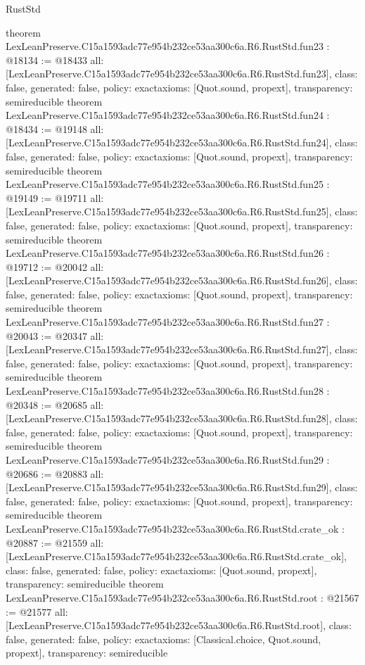 \begin{lexlean}{RustStd}
\begin{coremodule}
{}
theorem LexLeanPreserve.C15a1593adc77e954b232ce53aa300c6a.R6.RustStd.fun23 : @18134 := @18433 {
  all: [LexLeanPreserve.C15a1593adc77e954b232ce53aa300c6a.R6.RustStd.fun23],
  class: false,
  generated: false,
  policy: exact{axioms: [Quot.sound, propext]},
  transparency: semireducible
}
theorem LexLeanPreserve.C15a1593adc77e954b232ce53aa300c6a.R6.RustStd.fun24 : @18434 := @19148 {
  all: [LexLeanPreserve.C15a1593adc77e954b232ce53aa300c6a.R6.RustStd.fun24],
  class: false,
  generated: false,
  policy: exact{axioms: [Quot.sound, propext]},
  transparency: semireducible
}
theorem LexLeanPreserve.C15a1593adc77e954b232ce53aa300c6a.R6.RustStd.fun25 : @19149 := @19711 {
  all: [LexLeanPreserve.C15a1593adc77e954b232ce53aa300c6a.R6.RustStd.fun25],
  class: false,
  generated: false,
  policy: exact{axioms: [Quot.sound, propext]},
  transparency: semireducible
}
theorem LexLeanPreserve.C15a1593adc77e954b232ce53aa300c6a.R6.RustStd.fun26 : @19712 := @20042 {
  all: [LexLeanPreserve.C15a1593adc77e954b232ce53aa300c6a.R6.RustStd.fun26],
  class: false,
  generated: false,
  policy: exact{axioms: [Quot.sound, propext]},
  transparency: semireducible
}
theorem LexLeanPreserve.C15a1593adc77e954b232ce53aa300c6a.R6.RustStd.fun27 : @20043 := @20347 {
  all: [LexLeanPreserve.C15a1593adc77e954b232ce53aa300c6a.R6.RustStd.fun27],
  class: false,
  generated: false,
  policy: exact{axioms: [Quot.sound, propext]},
  transparency: semireducible
}
theorem LexLeanPreserve.C15a1593adc77e954b232ce53aa300c6a.R6.RustStd.fun28 : @20348 := @20685 {
  all: [LexLeanPreserve.C15a1593adc77e954b232ce53aa300c6a.R6.RustStd.fun28],
  class: false,
  generated: false,
  policy: exact{axioms: [Quot.sound, propext]},
  transparency: semireducible
}
theorem LexLeanPreserve.C15a1593adc77e954b232ce53aa300c6a.R6.RustStd.fun29 : @20686 := @20883 {
  all: [LexLeanPreserve.C15a1593adc77e954b232ce53aa300c6a.R6.RustStd.fun29],
  class: false,
  generated: false,
  policy: exact{axioms: [Quot.sound, propext]},
  transparency: semireducible
}
theorem LexLeanPreserve.C15a1593adc77e954b232ce53aa300c6a.R6.RustStd.crate_ok : @20887 := @21559 {
  all: [LexLeanPreserve.C15a1593adc77e954b232ce53aa300c6a.R6.RustStd.crate_ok],
  class: false,
  generated: false,
  policy: exact{axioms: [Quot.sound, propext]},
  transparency: semireducible
}
theorem LexLeanPreserve.C15a1593adc77e954b232ce53aa300c6a.R6.RustStd.root : @21567 := @21577 {
  all: [LexLeanPreserve.C15a1593adc77e954b232ce53aa300c6a.R6.RustStd.root],
  class: false,
  generated: false,
  policy: exact{axioms: [Classical.choice, Quot.sound, propext]},
  transparency: semireducible
}


\end{coremodule}
\end{lexlean}
